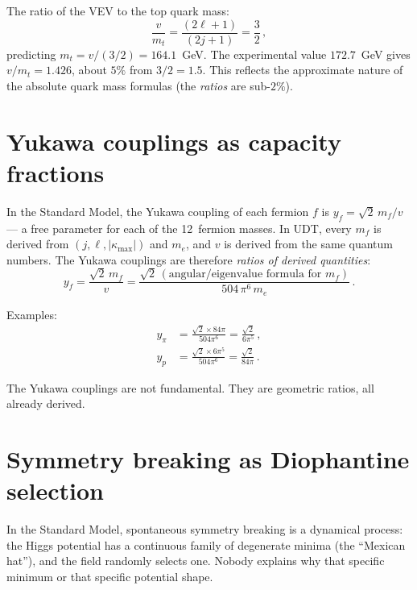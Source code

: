 \documentclass[11pt,letterpaper]{article}
\numberwithin{equation}{section}
\begin{document}
The ratio of the VEV to the top quark mass:
\begin{equation}
  \frac{v}{m_t} = \frac{(2\ell+1)}{(2j+1)} = \frac{3}{2}\,,
\end{equation}
predicting $m_t = v/(3/2) = 164.1$~GeV.  The experimental value
$172.7$~GeV gives $v/m_t = 1.426$, about $5\%$ from $3/2 = 1.5$.
This reflects the approximate nature of the absolute quark mass
formulas (the \emph{ratios} are sub-$2\%$).

\section{Yukawa couplings as capacity fractions}

In the Standard Model, the Yukawa coupling of each fermion $f$ is
$y_f = \sqrt{2}\,m_f/v$ --- a free parameter for each of the
12~fermion masses.  In UDT, every $m_f$ is derived from
$(j, \ell, |\kappa_\mathrm{max}|)$ and $m_e$, and $v$ is derived from
the same quantum numbers.  The Yukawa couplings are therefore
\emph{ratios of derived quantities}:
\begin{equation}
  y_f = \frac{\sqrt{2}\,m_f}{v}
  = \frac{\sqrt{2}\,(\text{angular/eigenvalue formula for }m_f)}%
         {504\,\pi^6\,m_e}\,.
\end{equation}

Examples:
\begin{align}
  y_\pi &= \frac{\sqrt{2} \times 84\pi}{504\pi^6}
  = \frac{\sqrt{2}}{6\pi^5}\,, \\
  y_p &= \frac{\sqrt{2} \times 6\pi^5}{504\pi^6}
  = \frac{\sqrt{2}}{84\pi}\,.
\end{align}

The Yukawa couplings are not fundamental.  They are geometric ratios,
all already derived.

\section{Symmetry breaking as Diophantine selection}

In the Standard Model, spontaneous symmetry breaking is a dynamical
process: the Higgs potential has a continuous family of degenerate
minima (the ``Mexican hat''), and the field randomly selects one.
Nobody explains why that specific minimum or that specific potential
shape.
\end{document}
